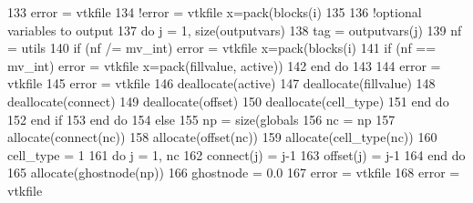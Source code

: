 \begin{DoxyCode}
133                     error = vtkfile%
134                     \textcolor{comment}{!error = vtkfile%
       x=pack(blocks(i)%
135 
136                     \textcolor{comment}{!optional variables to output}
137                     \textcolor{keywordflow}{do} j = 1, \textcolor{keyword}{size}(outputvars)
138                         tag = outputvars(j)
139                         nf = utils%
140                         \textcolor{keywordflow}{if} (nf /= mv\_int) error = vtkfile%
       x=pack(blocks(i)%
141                         \textcolor{keywordflow}{if} (nf == mv\_int) error = vtkfile%
       x=pack(fillvalue, active))
142 \textcolor{keywordflow}{                    end do}
143 
144                     error = vtkfile%
145                     error = vtkfile%
146                     \textcolor{keyword}{deallocate}(active)
147                     \textcolor{keyword}{deallocate}(fillvalue)
148                     \textcolor{keyword}{deallocate}(connect)
149                     \textcolor{keyword}{deallocate}(offset)
150                     \textcolor{keyword}{deallocate}(cell\_type)
151 \textcolor{keywordflow}{                end do}
152 \textcolor{keywordflow}{            end if}
153 \textcolor{keywordflow}{        end do}
154     \textcolor{keywordflow}{else}
155         np = \textcolor{keyword}{size}(globals%
156         nc = np
157         \textcolor{keyword}{allocate}(connect(nc))
158         \textcolor{keyword}{allocate}(offset(nc))
159         \textcolor{keyword}{allocate}(cell\_type(nc))
160         cell\_type = 1
161         \textcolor{keywordflow}{do} j = 1, nc
162             connect(j) = j-1
163             offset(j) = j-1
164 \textcolor{keywordflow}{        end do}
165         \textcolor{keyword}{allocate}(ghostnode(np))
166         ghostnode = 0.0
167         error = vtkfile%
168         error = vtkfile%
}
\end{DoxyCode}
